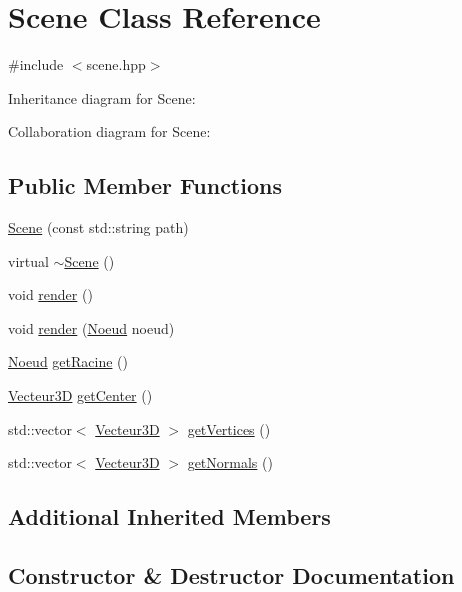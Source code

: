 \hypertarget{class_scene}{}\section{Scene Class Reference}
\label{class_scene}


{\ttfamily \#include $<$scene.\+hpp$>$}



Inheritance diagram for Scene\+:


Collaboration diagram for Scene\+:
\subsection*{Public Member Functions}
\begin{DoxyCompactItemize}
\item 
\hyperlink{class_scene_af761cd03640e306bc55afa79093e334d}{Scene} (const std\+::string path)
\item 
virtual \hyperlink{class_scene_a3b8cec2e32546713915f8c6303c951f1}{$\sim$\+Scene} ()
\item 
void \hyperlink{class_scene_a4ddf2d16f371ee9533b3faf1dd5ddfb1}{render} ()
\item 
void \hyperlink{class_scene_af0747116905b9098ba3bd2c9d4b67162}{render} (\hyperlink{class_noeud}{Noeud} noeud)
\item 
\hyperlink{class_noeud}{Noeud} \hyperlink{class_scene_a6d9239ca059ca24b0a767aebc1c9a63b}{get\+Racine} ()
\item 
\hyperlink{class_vecteur3_d}{Vecteur3D} \hyperlink{class_scene_ada5afef61a8061abb6d3dfb38802f551}{get\+Center} ()
\item 
std\+::vector$<$ \hyperlink{class_vecteur3_d}{Vecteur3D} $>$ \hyperlink{class_scene_a899e0ef799504383505743ebecc58406}{get\+Vertices} ()
\item 
std\+::vector$<$ \hyperlink{class_vecteur3_d}{Vecteur3D} $>$ \hyperlink{class_scene_a98442b4ed5ff289a695d9a6eea7b6ebd}{get\+Normals} ()
\end{DoxyCompactItemize}
\subsection*{Additional Inherited Members}


\subsection{Constructor \& Destructor Documentation}
